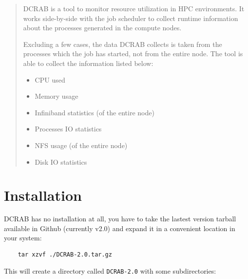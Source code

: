 \documentclass[10pt,a4paper]{report}
\begin{document}

\begin{abstract}

DCRAB is a tool to monitor resource utilization in HPC environments. It works side-by-side with the job scheduler to collect runtime information about the processes generated in the compute nodes.

Excluding a few cases, the data DCRAB collects is taken from the processes which the job has started, not from the entire node. The tool is able to collect the information listed below:

\begin{itemize}
	\item CPU used
	\item Memory usage
	\item Infiniband statistics (of the entire node)
	\item Processes IO statistics
	\item NFS usage (of the entire node)
	\item Disk IO statistics
\end{itemize}

\end{abstract}


\tableofcontents


\chapter{Installation}

DCRAB has no installation at all, you have to take the lastest version tarball available in Github (currently v2.0) and expand it in a convenient location in your system:

\begin{verbatim}
    tar xzvf ./DCRAB-2.0.tar.gz
\end{verbatim}

This will create a directory called \verb+DCRAB-2.0+ with some subdirectories:
\end{document}
